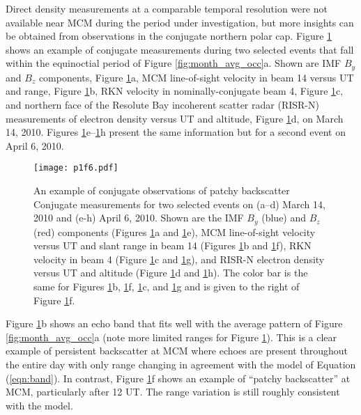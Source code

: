 Direct density measurements at a comparable temporal resolution were not available near MCM during the period under investigation, but more insights can be obtained from observations in the conjugate northern polar cap. Figure \ref{fig:patchy_example} shows an example of conjugate measurements during two selected events that fall within the equinoctial period of Figure \ref{fig:month_avg_occ}a. Shown are IMF \(B_y\) and \(B_z\) components, Figure \ref{fig:patchy_example}a, MCM line-of-sight velocity in beam 14 versus UT and range, Figure \ref{fig:patchy_example}b, RKN velocity in nominally-conjugate beam 4, Figure \ref{fig:patchy_example}c, and northern face of the Resolute Bay incoherent scatter radar (RISR-N) measurements of electron density versus UT and altitude, Figure \ref{fig:patchy_example}d, on March 14, 2010. Figures \ref{fig:patchy_example}e--\ref{fig:patchy_example}h present the same information but for a second event on April 6, 2010.

\begin{figure}
	\centering
	\texttt{[image: p1f6.pdf]}
	\caption[An example of conjugate observations of patchy backscatter]{{\:}An example of conjugate observations of patchy backscatter\\ Conjugate measurements for two selected events on (a--d) March 14, 2010 and (e-h) April 6, 2010. Shown are the IMF \(B_y\) (blue) and \(B_z\) (red) components (Figures \ref{fig:patchy_example}a and \ref{fig:patchy_example}e), MCM line-of-sight velocity versus UT and slant range in beam 14 (Figures \ref{fig:patchy_example}b and \ref{fig:patchy_example}f), RKN velocity in beam 4 (Figure \ref{fig:patchy_example}c and \ref{fig:patchy_example}g), and RISR-N electron density versus UT and altitude (Figure \ref{fig:patchy_example}d and \ref{fig:patchy_example}h). The color bar is the same for Figures \ref{fig:patchy_example}b, \ref{fig:patchy_example}f, \ref{fig:patchy_example}c, and \ref{fig:patchy_example}g and is given to the right of Figure \ref{fig:patchy_example}f.}
	\label{fig:patchy_example}
\end{figure}

Figure \ref{fig:patchy_example}b shows an echo band that fits well with the average pattern of Figure \ref{fig:month_avg_occ}a (note more limited ranges for Figure \ref{fig:patchy_example}). This is a clear example of persistent backscatter at MCM where echoes are present throughout the entire day with only range changing in agreement with the model of Equation (\ref{eqn:band}). In contrast, Figure \ref{fig:patchy_example}f shows an example of ``patchy backscatter'' at MCM, particularly after 12 UT. The range variation is still roughly consistent with the model. 

